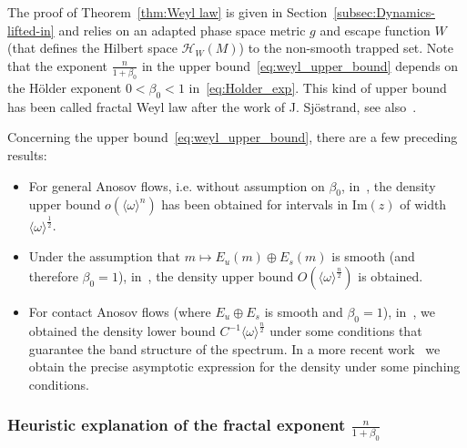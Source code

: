 \documentclass[10pt]{amsart}
\theoremstyle{definition}\newtheorem{defi}[theo]{Definition}\newtheorem{rema}[theo]{Remark}\newtheorem{exam}[theo]{Example}\newtheorem{exem}[theo]{Example}\newtheorem{nota}[theo]{Notation}
\newcommand{\clH}{\mathcal{H}}
\newcommand{\Imm}{\mathrm{Im}}
\begin{document}
The proof of Theorem~\ref{thm:Weyl law} is given in Section~\ref{subsec:Dynamics-lifted-in} and relies on an adapted phase space metric $g$ and escape function $W$ (that defines the Hilbert space $\clH _{W}(M)$) to the non-smooth trapped set. Note that the exponent $\frac{n}{1+\beta_{0}}$ in the upper bound~\eqref{eq:weyl_upper_bound} depends on the H\"older exponent $0<\beta_{0}<1$ in~\eqref{eq:Holder_exp}. This kind of upper bound has been called fractal Weyl law after the work of J. Sj\"ostrand\cite{sjostrand_90}, see also~\cite{Nonnenmacher_Zworski_14}.

Concerning the upper bound~\eqref{eq:weyl_upper_bound}, there are a few preceding results:
\begin{itemize}
\item For general Anosov flows, i.e. without assumption on $\beta_{0}$, in~\cite[Theorem~1.8]{fred_flow_09}, the density upper bound $o(\langle \omega\rangle ^{n})$ has been obtained for intervals in $\Imm(z)$ of width $\langle \omega\rangle ^{\frac{1}{2}}$.
\item Under the assumption that $m\mapsto E_{u}(m)\oplus E_{s}(m)$ is smooth (and therefore $\beta_{0}=1$), in~\cite{dyatlov_Ruelle_resonances_2012}, the density upper bound \emph{$O(\langle \omega\rangle ^{\frac{n}{2}})$} is obtained.
\item For contact Anosov flows (where $E_{u}\oplus E_{s}$ is smooth and $\beta_{0}=1$), in~\cite{faure_tsujii_band_CRAS_2013,faure-tsujii_anosov_flows_13,faure-tsujii_anosov_flows_16}, we obtained the density lower bound $C^{-1}\langle \omega\rangle ^{\frac{n}{2}}$ under some conditions that guarantee the band structure of the spectrum. In a more recent work~\cite{faure-tsujii_anosov_flows_16} we obtain the precise asymptotic expression for the density under some pinching conditions.
\end{itemize}

\subsubsection{\label{subsec:Heuristic-explanation-of}
Heuristic explanation of the fractal exponent \texorpdfstring{$\frac{n}{1+\beta_{0}}$}{n/1+ beta0}}
\end{document}
